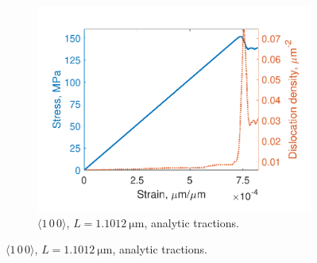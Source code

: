 \begin{figure}
    \begin{subfigure}[t]{0.45\linewidth}
        \centering
        \includegraphics[width=\linewidth]{../data/density_16-Mar-2021_8_tensile_ni_100.pdf}
        \caption{$\langle 1\, 0\, 0 \rangle$, $L = \SI{1.1012}{\micro\metre}$, analytic tractions.}
        \label{sf:stressDens3}
    \end{subfigure}


\end{figure}

